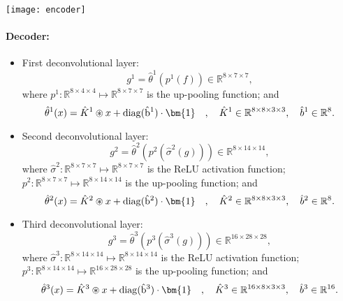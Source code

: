             \begin{center}
                \texttt{[image: encoder]}
            \end{center}

    \paragraph{Decoder:}
    \begin{itemize}
        \footnotesize
        \item First deconvolutional layer:
            \begin{equation*}
                g^1=\hat\theta^1 (p^1(f))\in \mathbb{R}^{8\times 7\times 7},
            \end{equation*}
            where $p^1: \mathbb{R}^{8\times 4\times 4}\mapsto \mathbb{R}^{8\times 7\times 7}$ is the up-pooling function; and 
            \begin{equation*}
                \hat\theta^1(x) = \hat K^1 \circledast x + {\rm{diag}(\hat b^1) }\cdot \bm{1} \quad, \quad \hat K^1 \in \mathbb R^{8 \times 8 \times 3 \times 3}, \quad \hat b^1 \in \mathbb R^{8}.
            \end{equation*}
        \item Second deconvolutional layer:
            \begin{equation*}
                g^2=\hat\theta^2 (p^2(\hat\sigma^2(g)))\in \mathbb{R}^{8\times 14\times 14},
            \end{equation*}
            where $\hat\sigma^2: \mathbb{R}^{8\times 7\times 7}\mapsto \mathbb{R}^{8\times 7\times 7}$ is the ReLU activation function; 
            $p^2: \mathbb{R}^{8\times 7\times 7}\mapsto \mathbb{R}^{8\times 14\times 14}$ is the up-pooling function; and 
            \begin{equation*}
                \hat\theta^2(x) = \hat K^2 \circledast x + {\rm{diag}(\hat b^2) }\cdot \bm{1} \quad, \quad \hat K^2 \in \mathbb R^{8 \times 8 \times 3 \times 3}, \quad \hat b^2 \in \mathbb R^{8}.
            \end{equation*}
        \item Third deconvolutional layer:
            \begin{equation*}
                g^3=\hat\theta^3(p^3(\hat\sigma^3(g)))\in \mathbb{R}^{16\times 28\times 28},
            \end{equation*}
            where $\hat\sigma^3: \mathbb{R}^{8\times 14\times 14}\mapsto \mathbb{R}^{8\times 14\times 14}$ is the ReLU activation function; 
            $p^3: \mathbb{R}^{8\times 14\times 14}\mapsto \mathbb{R}^{16\times 28\times 28}$ is the up-pooling function; and
            \begin{equation*}
                \hat\theta^3(x) = \hat K^3 \circledast x + {\rm{diag}(\hat b^3) }\cdot \bm{1} \quad, \quad \hat K^3 \in \mathbb R^{16 \times 8 \times 3 \times 3}, \quad \hat b^3 \in \mathbb R^{16}.
            \end{equation*}
    \end{itemize}

